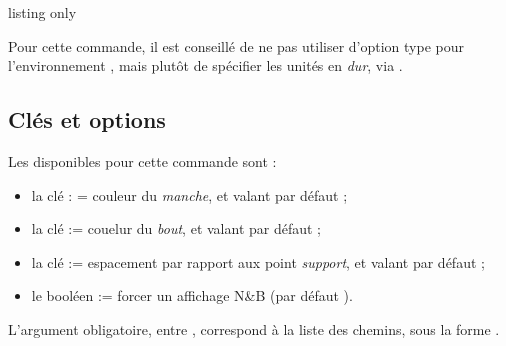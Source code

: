 \begin{PresCodeTexPL}{listing only}
\end{PresCodeTexPL}

\begin{PresCodeTexPL}{}
\end{PresCodeTexPL}

\begin{cautionblock}
Pour cette commande, il est conseillé de ne pas utiliser d'option type  pour l'environnement , mais plutôt de spécifier les unités en \textit{dur}, via .
\end{cautionblock}

\subsection{Clés et options}

\begin{cautionblock}
Les  disponibles pour cette commande sont :

\begin{itemize}
	\item la clé  : = couleur du \textit{manche}, et valant  par défaut ;
	\item la clé  := couelur du \textit{bout}, et valant  par défaut ;
	\item la clé  := espacement par rapport aux point \textit{support}, et valant \Cle{0.224cm} par défaut ;
	\item le booléen  := forcer un affichage N\&B (par défaut ).
\end{itemize}

L'argument obligatoire, entre , correspond à la liste des chemins, sous la forme .
\end{cautionblock}

\begin{PresCodeTexPL}{}
\end{PresCodeTexPL}

